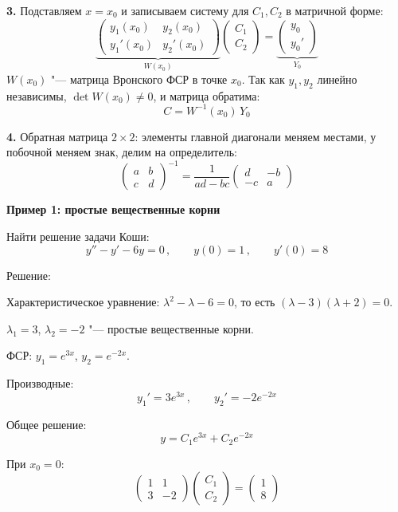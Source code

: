 \documentclass[11pt,a4paper]{article}
\newcommand{\example}[1]{\par\medskip\noindent\textbf{#1}\par\nopagebreak\smallskip}
\begin{document}
\textbf{3.} Подставляем $x = x_0$ и записываем систему для $C_1, C_2$ в матричной форме:
\[
  \underbrace{\begin{pmatrix} y_1(x_0) & y_2(x_0) \\ y_1'(x_0) & y_2'(x_0) \end{pmatrix}}_{W(x_0)}
  \begin{pmatrix} C_1 \\ C_2 \end{pmatrix}
  =
  \underbrace{\begin{pmatrix} y_0 \\ y_0' \end{pmatrix}}_{Y_0}
\]
$W(x_0)$ "--- матрица Вронского ФСР в точке $x_0$. Так как $y_1, y_2$ линейно независимы, $\det W(x_0) \ne 0$, и матрица обратима:
\[
  C = W^{-1}(x_0)\, Y_0
\]

\textbf{4.} Обратная матрица $2 \times 2$: элементы главной диагонали меняем местами, 
у побочной меняем знак, делим на определитель:
\[
  \begin{pmatrix} a & b \\ c & d \end{pmatrix}^{-1}
  = \frac{1}{ad - bc}
  \begin{pmatrix} d & -b \\ -c & a \end{pmatrix}
\]

\example{Пример 1: простые вещественные корни}

Найти решение задачи Коши:
\[
  y'' - y' - 6y = 0\,, \qquad y(0) = 1\,, \qquad y'(0) = 8
\]

Решение:

Характеристическое уравнение: $\lambda^2 - \lambda - 6 = 0$, то есть $(\lambda - 3)(\lambda + 2) = 0$.

$\lambda_1 = 3$, $\lambda_2 = -2$ "--- простые вещественные корни.

ФСР: $y_1 = e^{3x}$, $y_2 = e^{-2x}$.

Производные:
\[
  y_1' = 3 e^{3x}\,, \qquad y_2' = - 2e^{-2x}
\]

Общее решение:
\[
  y = C_1 e^{3x} + C_2 e^{-2x}
\]

При $x_0 = 0$:
\[
  \begin{pmatrix} 1 & 1 \\ 3 & -2 \end{pmatrix}
  \begin{pmatrix} C_1 \\ C_2 \end{pmatrix}
  =
  \begin{pmatrix} 1 \\ 8 \end{pmatrix}
\]
\end{document}
